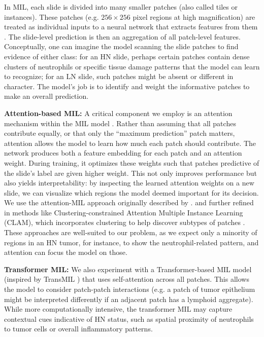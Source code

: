 In MIL, each slide is divided into many smaller patches (also called tiles or instances). These patches (e.g. $256\times256$ pixel regions at high magnification) are treated as individual inputs to a neural network that extracts features from them \cite{Lu,campanella2019}. The slide-level prediction is then an aggregation of all patch-level features. Conceptually, one can imagine the model scanning the slide patches to find evidence of either class: for an HN slide, perhaps certain patches contain dense clusters of neutrophils or specific tissue damage patterns that the model can learn to recognize; for an LN slide, such patches might be absent or different in character. The model's job is to identify and weight the informative patches to make an overall prediction.

\textbf{Attention-based MIL:} A critical component we employ is an attention mechanism within the MIL model \cite{ilse2018}. Rather than assuming that all patches contribute equally, or that only the ``maximum prediction'' patch matters, attention allows the model to learn how much each patch should contribute. The network produces both a feature embedding for each patch and an attention weight. During training, it optimizes these weights such that patches predictive of the slide's label are given higher weight. This not only improves performance but also yields interpretability: by inspecting the learned attention weights on a new slide, we can visualize which regions the model deemed important for its decision. We use the attention-MIL approach originally described by \cite{ilse2018}. and further refined in methods like Clustering-constrained Attention Multiple Instance Learning (CLAM), which incorporates clustering to help discover subtypes of patches \cite{Lu}. These approaches are well-suited to our problem, as we expect only a minority of regions in an HN tumor, for instance, to show the neutrophil-related pattern, and attention can focus the model on those.

\textbf{Transformer MIL:} We also experiment with a Transformer-based MIL model (inspired by TransMIL \cite{shao2021}) that uses self-attention across all patches. This allows the model to consider patch-patch interactions (e.g. a patch of tumor epithelium might be interpreted differently if an adjacent patch has a lymphoid aggregate). While more computationally intensive, the transformer MIL may capture contextual cues indicative of HN status, such as spatial proximity of neutrophils to tumor cells or overall inflammatory patterns.

